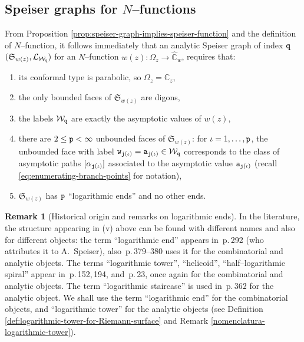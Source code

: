 \documentclass[final,3p,times]{elsarticle}
\newcommand{\CC}{\ensuremath{{\mathbb C}}}
\newcommand{\CW}{\ensuremath{{\widehat{\mathbb C}}}}
\theoremstyle{definition}
\newtheorem{remark}[theorem]{Remark}
\begin{document}
\subsection{Speiser graphs for $N$--functions}
\label{subsec:Speiser-for-N-functions}
From Proposition \ref{prop:speiser-graph-implies-speiser-function} and the definition of
$N$--function, it follows immediately that an analytic Speiser graph of index $\tt q$
$(\mathfrak{S}_{w(z)}, \mathcal{L}_{\mathcal{W}_{\tt q}})$ for an $N$--function 
$w(z):\Omega_z\longrightarrow \CW_w$, requires that:
\begin{enumerate}[label=\roman*),leftmargin=*]

\item 
its conformal type is parabolic, so $\Omega_z = \CC_z$,

\item
the only bounded faces of $\mathfrak{S}_{w(z)}$ are digons,

\item
the labels $\mathcal{W}_{\tt q}$
are exactly the asymptotic values of $w(z)$,

\item
there are $2\leq{\tt p}<\infty$ unbounded faces of 
$\mathfrak{S}_{w(z)}$:
for $\iota=1,\ldots,\tt p$, the unbounded face with label 
${\tt w}_{{\tt j}(\iota)}={\tt a}_{{\tt j}(\iota)}\in\mathcal{W}_{\tt q}$
corresponds to the class of asymptotic paths $[\alpha_{{\tt j}(\iota)}]$ 
associated to the asymptotic value ${\tt a}_{{\tt j}(\iota)}$ 
(recall \eqref{eq:enumerating-branch-points} for notation),

\item
$\mathfrak{S}_{w(z)}$ 
has $\tt p$ ``logarithmic ends'' and no other ends.
\end{enumerate}

\begin{remark}[Historical origin and remarks on logarithmic ends]
\label{rem:historical-origin-log-ends}
In the literature, the structure appearing in (v) above can be found with different names 
and also for different objects:
the term ``logarithmic end'' appears in 
\cite{Nevanlinna2}\,p.\,292 (who attributes it to A.\ Speiser), 
also \cite{GoldbergOstrovskii}\,p.\,379--380 uses it for
the combinatorial and analytic objects. 
The terms ``logarithmic tower'', ``helicoid'', ``half--logarithmic spiral'' appear in  
\cite{AlvarezMucino1}\,p.\,152,\,194, and
\cite{AlvarezMucino3}\,p.\,23, once again for the combinatorial and analytic objects.
The term ``logarithmic staircase'' is used in \cite{Geyer-Merenkov}\,p.\,362 for the analytic object. 
We shall use the term ``logarithmic end'' for the combinatorial objects,
and ``logarithmic tower'' for the analytic objects
(see Definition \ref{def:logarithmic-tower-for-Riemann-surface} 
and Remark \ref{nomenclatura-logarithmic-tower}).
\end{remark}
\end{document}

